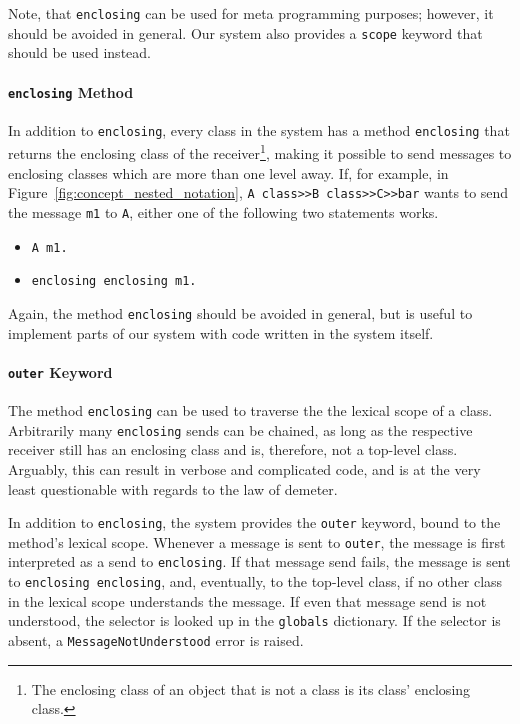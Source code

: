 Note, that \texttt{enclosing} can be used for meta programming purposes; however, it should be avoided in general. Our system also provides a \texttt{scope} keyword that should be used instead.

\paragraph{\texttt{enclosing} Method}
In addition to \texttt{enclosing}, every class in the system has a method \texttt{enclosing} that returns the enclosing class of the receiver\footnote{The enclosing class of an object that is not a class is its class' enclosing class.}, making it possible to send messages to enclosing classes which are more than one level away. If, for example, in Figure~\ref{fig:concept_nested_notation}, \texttt{A class>>B class>>C>>bar} wants to send the message \texttt{m1} to \texttt{A}, either one of the following two statements works.

\begin{itemize}
	\item \texttt{A m1.}
	\item \texttt{enclosing enclosing m1.}
\end{itemize}

Again, the method \texttt{enclosing} should be avoided in general, but is useful to implement parts of our system with code written in the system itself.

\paragraph{\texttt{outer} Keyword}
The method \texttt{enclosing} can be used to traverse the the lexical scope of a class. Arbitrarily many \texttt{enclosing} sends can be chained, as long as the respective receiver still has an enclosing class and is, therefore, not a top-level class. Arguably, this can result in verbose and complicated code, and is at the very least questionable with regards to the law of demeter.

In addition to \texttt{enclosing}, the system provides the \texttt{outer} keyword, bound to the method's lexical scope. Whenever a message is sent to \texttt{outer}, the message is first interpreted as a send to \texttt{enclosing}. If that message send fails, the message is sent to \texttt{enclosing enclosing}, and, eventually, to the top-level class, if no other class in the lexical scope understands the message. If even that message send is not understood, the selector is looked up in the \texttt{globals} dictionary. If the selector is absent, a \texttt{MessageNotUnderstood} error is raised.

